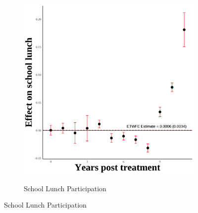 \documentclass[12pt,english]{article}
\begin{document}
\begin{figure}[H]
\begin{subfigure}[b]{0.3\textwidth}
    \label{fig:ln-schl-lunch-second}
  \end{subfigure}
  \hfill
  \begin{subfigure}[b]{0.3\textwidth}
    \centering
    \caption{School Lunch Participation}
    \includegraphics[width=\linewidth]{figures/plot19-schl_lunch_event_study-second.png}
    \label{fig:schl-lunch-second}
  \end{subfigure}

  \vspace{0.3cm} %


\end{figure}
\end{document}
